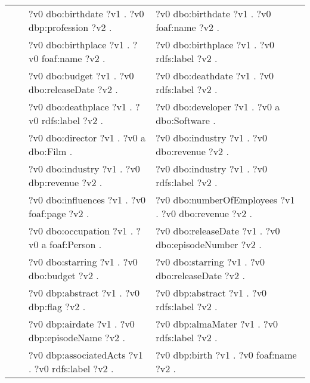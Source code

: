 \begin{table}
{\begin{tabular}{!{\color{white}\vrule}l!{\color{white}\vrule}c@{\hs}!{\color{white}\vrule}p{11.5cm}!{\color{white}\vrule}p{11.5cm}!{\color{white}\vrule}}
			 &  \phantom{a} &     ?v0 dbo:birthdate ?v1 .  ?v0 dbp:profession ?v2 . &  ?v0 dbo:birthdate ?v1 .  ?v0 foaf:name ?v2 . \\
			 &  \phantom{a} &     ?v0 dbo:birthplace ?v1 .  ?v0 foaf:name ?v2 . &  ?v0 dbo:birthplace ?v1 .  ?v0 rdfs:label ?v2 . \\
			 &  \phantom{a} &     ?v0 dbo:budget ?v1 .  ?v0 dbo:releaseDate ?v2 . &  ?v0 dbo:deathdate ?v1 .  ?v0 rdfs:label ?v2 . \\
			 &  \phantom{a} &     ?v0 dbo:deathplace ?v1 .  ?v0 rdfs:label ?v2 . &  ?v0 dbo:developer ?v1 .  ?v0 a dbo:Software . \\
			 &  \phantom{a} &     ?v0 dbo:director ?v1 .  ?v0 a dbo:Film . &  ?v0 dbo:industry ?v1 .  ?v0 dbo:revenue ?v2 . \\
			 &  \phantom{a} &     ?v0 dbo:industry ?v1 .  ?v0 dbp:revenue ?v2 . &  ?v0 dbo:industry ?v1 .  ?v0 rdfs:label ?v2 . \\
			 &  \phantom{a} &     ?v0 dbo:influences ?v1 .  ?v0 foaf:page ?v2 . &  ?v0 dbo:numberOfEmployees ?v1 .  ?v0 dbo:revenue ?v2 . \\
			 &  \phantom{a} &     ?v0 dbo:occupation ?v1 .  ?v0 a foaf:Person . &  ?v0 dbo:releaseDate ?v1 .  ?v0 dbo:episodeNumber ?v2 . \\
			 &  \phantom{a} &     ?v0 dbo:starring ?v1 .  ?v0 dbo:budget ?v2 . &  ?v0 dbo:starring ?v1 .  ?v0 dbo:releaseDate ?v2 . \\
			 &  \phantom{a} &     ?v0 dbp:abstract ?v1 .  ?v0 dbp:flag ?v2 . &  ?v0 dbp:abstract ?v1 .  ?v0 rdfs:label ?v2 . \\
			 &  \phantom{a} &     ?v0 dbp:airdate ?v1 .  ?v0 dbp:episodeName ?v2 . &  ?v0 dbp:almaMater ?v1 .  ?v0 rdfs:label ?v2 . \\
			 &  \phantom{a} &     ?v0 dbp:associatedActs ?v1 .  ?v0 rdfs:label ?v2 . &  ?v0 dbp:birth ?v1 .  ?v0 foaf:name ?v2 . \\

\end{tabular}}
\end{table}
